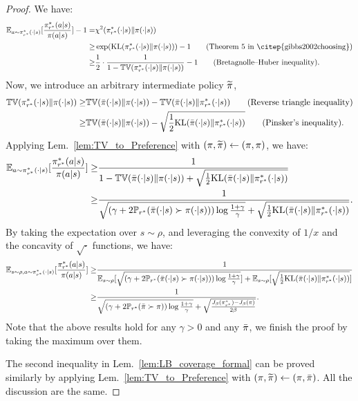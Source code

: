 \begin{proof}
    We have:
    \begin{align*}
        \EE_{a\sim \pi^*_{r^*}(\cdot|s)}[\frac{\pi^*_{r^*}(a|s)}{\pi(a|s)}] - 1=& \chi^2(\pi^*_{r^*}(\cdot|s)\|\pi(\cdot|s)) \\
        \geq & \exp(\KL(\pi^*_{r^*}(\cdot|s) \| \pi(\cdot|s))) - 1 \tag{Theorem 5 in \citep{gibbs2002choosing}}\\
        \geq & \frac{1}{2} \cdot \frac{1}{1 - \TV(\pi^*_{r^*}(\cdot|s)\|\pi(\cdot|s))} - 1 \tag{Bretagnolle–Huber inequality}.
    \end{align*}
    Now, we introduce an arbitrary intermediate policy $\widetilde{\pi}$, 
    \begin{align*}
        \mathbb{TV}(\pi^*_{r^*}(\cdot|s)\|\pi(\cdot|s))
        \geq & \mathbb{TV}(\bar{\pi}(\cdot|s)\|\pi(\cdot|s)) - \mathbb{TV}(\bar{\pi}(\cdot|s)\|\pi^*_{r^*}(\cdot|s)) \tag{Reverse triangle inequality}\\
        \geq & \mathbb{TV}(\bar{\pi}(\cdot|s)\|\pi(\cdot|s)) - \sqrt{\frac{1}{2} \text{KL}(\bar{\pi}(\cdot|s)\|\pi^*_{r^*}(\cdot|s))} \tag{Pinsker's inequality}.
    \end{align*}
    Applying Lem.~\ref{lem:TV_to_Preference} with $(\pi, \widetilde{\pi}) \gets (\pi, \pi)$, we have:
    \begin{align*}
        \mathbb{E}_{a\sim \pi^*_{r^*}(\cdot|s)}[\frac{\pi^*_{r^*}(a|s)}{\pi(a|s)}] \geq & \frac{1}{1 - \mathbb{TV}(\bar{\pi}(\cdot|s)\|\pi(\cdot|s)) + \sqrt{\frac{1}{2} \text{KL}(\bar{\pi}(\cdot|s)\|\pi^*_{r^*}(\cdot|s))}} \\
        \geq & \frac{1}{\sqrt{(\gamma + 2{\mathbb{P}}_{r^*}(\bar{\pi}(\cdot|s) \succ \pi(\cdot|s))) \log \frac{1+\gamma}{\gamma}} + \sqrt{\frac{1}{2} \text{KL}(\bar{\pi}(\cdot|s)\|\pi^*_{r^*}(\cdot|s))}}.
    \end{align*}
    By taking the expectation over $s\sim\rho$, and leveraging the convexity of $1/x$ and the concavity of $\sqrt{\cdot}$ functions, we have:
    \begin{align*}
        \mathbb{E}_{s\sim\rho,a\sim \pi^*_{r^*}(\cdot|s)}[\frac{\pi^*_{r^*}(a|s)}{\pi(a|s)}] \geq& \frac{1}{\mathbb{E}_{s\sim\rho}[\sqrt{(\gamma + 2{\mathbb{P}}_{r^*}(\bar{\pi}(\cdot|s) \succ \pi(\cdot|s))) \log \frac{1+\gamma}{\gamma}}] + \mathbb{E}_{s\sim\rho}[\sqrt{\frac{1}{2} \text{KL}(\bar{\pi}(\cdot|s)\|\pi^*_{r^*}(\cdot|s))}]} \\
        \geq & \frac{1}{\sqrt{(\gamma + 2{\mathbb{P}}_{r^*}(\bar{\pi}\succ\pi))\log\frac{1+\gamma}{\gamma}}+\sqrt{\frac{J_\beta(\pi^*_{r^*}) - J_\beta(\pi)}{2\beta}}}.
    \end{align*}
    Note that the above results hold for any $\gamma > 0$ and any $\bar{\pi}$, we finish the proof by taking the maximum over them.

    The second inequality in Lem.~\ref{lem:LB_coverage_formal} can be proved similarly by applying Lem.~\ref{lem:TV_to_Preference} with $(\pi, \widetilde{\pi}) \gets (\pi, \bar{\pi})$. All the discussion are the same.
\end{proof}

